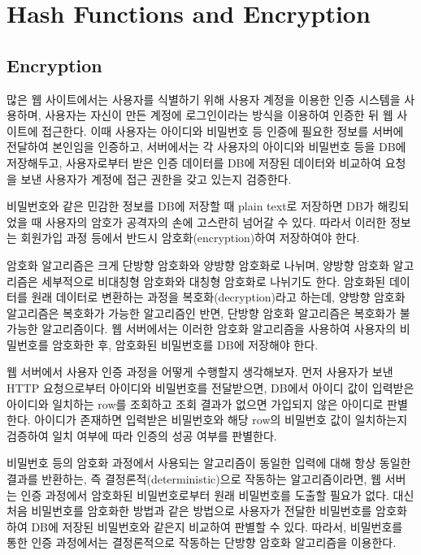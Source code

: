\section{Hash Functions and Encryption}\label{sect:encryption}

\subsection*{Encryption}

많은 웹 사이트에서는 사용자를 식별하기 위해 사용자 계정을 이용한 인증 시스템을 사용하며, 사용자는 자신이 만든 계정에 로그인이라는 방식을 이용하여 인증한 뒤 웹 사이트에 접근한다. 이때 사용자는 아이디와 비밀번호 등 인증에 필요한 정보를 서버에 전달하여 본인임을 인증하고, 서버에서는 각 사용자의 아이디와 비밀번호 등을 DB에 저장해두고, 사용자로부터 받은 인증 데이터를 DB에 저장된 데이터와 비교하여 요청을 보낸 사용자가 계정에 접근 권한을 갖고 있는지 검증한다.

비밀번호와 같은 민감한 정보를 DB에 저장할 때 plain text로 저장하면 DB가 해킹되었을 때 사용자의 암호가 공격자의 손에 고스란히 넘어갈 수 있다. 따라서 이러한 정보는 회원가입 과정 등에서 반드시 암호화(encryption)하여 저장하여야 한다.

암호화 알고리즘은 크게 단방향 암호화와 양방향 암호화로 나뉘며, 양방향 암호화 알고리즘은 세부적으로 비대칭형 암호화와 대칭형 암호화로 나뉘기도 한다. 암호화된 데이터를 원래 데이터로 변환하는 과정을 복호화(decryption)라고 하는데, 양방향 암호화 알고리즘은 복호화가 가능한 알고리즘인 반면, 단방향 암호화 알고리즘은 복호화가 불가능한 알고리즘이다. 웹 서버에서는 이러한 암호화 알고리즘을 사용하여 사용자의 비밀번호를 암호화한 후, 암호화된 비밀번호를 DB에 저장해야 한다.

웹 서버에서 사용자 인증 과정을 어떻게 수행할지 생각해보자. 먼저 사용자가 보낸 HTTP 요청으로부터 아이디와 비밀번호를 전달받으면, DB에서 아이디 값이 입력받은 아이디와 일치하는 row를 조회하고 조회 결과가 없으면 가입되지 않은 아이디로 판별한다. 아이디가 존재하면 입력받은 비밀번호와 해당 row의 비밀번호 값이 일치하는지 검증하여 일치 여부에 따라 인증의 성공 여부를 판별한다.

비밀번호 등의 암호화 과정에서 사용되는 알고리즘이 동일한 입력에 대해 항상 동일한 결과를 반환하는, 즉 결정론적(deterministic)으로 작동하는 알고리즘이라면, 웹 서버는 인증 과정에서 암호화된 비밀번호로부터 원래 비밀번호를 도출할 필요가 없다. 대신 처음 비밀번호를 암호화한 방법과 같은 방법으로 사용자가 전달한 비밀번호를 암호화하여 DB에 저장된 비밀번호와 같은지 비교하여 판별할 수 있다. 따라서, 비밀번호를 통한 인증 과정에서는 결정론적으로 작동하는 단방향 암호화 알고리즘을 이용한다.

